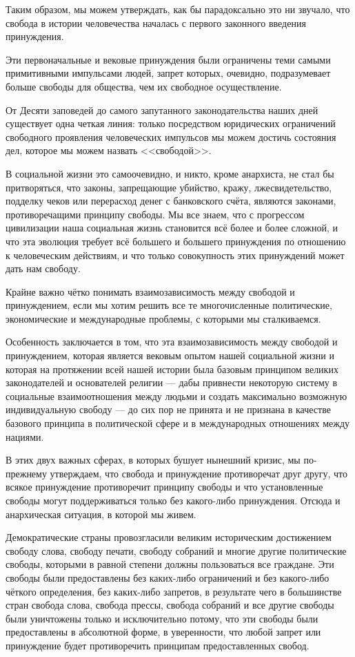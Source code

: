Таким образом, мы можем утверждать, как бы парадоксально это ни звучало, что свобода в истории человечества началась с первого законного введения принуждения.
 
Эти первоначальные и вековые принуждения были ограничены теми самыми примитивными импульсами людей, запрет которых, очевидно, подразумевает больше свободы для общества, чем их свободное осуществление.

От Десяти заповедей до самого запутанного законодательства наших дней существует одна четкая линия: только посредством юридических ограничений свободного проявления человеческих импульсов мы можем достичь состояния дел, которое мы можем назвать <<свободой>>.
 
В социальной жизни это самоочевидно, и никто, кроме анархиста, не стал бы притворяться, что законы, запрещающие убийство, кражу, лжесвидетельство, подделку чеков или перерасход денег с банковского счёта, являются законами, противоречащими принципу свободы. Мы все знаем, что с прогрессом цивилизации наша социальная жизнь становится всё более и более сложной, и что эта эволюция требует всё большего и большего принуждения по отношению к человеческим действиям, и что только совокупность этих принуждений может дать нам свободу.

Крайне важно чётко понимать взаимозависимость между свободой и принуждением, если мы хотим решить все те многочисленные политические, экономические и международные проблемы, с которыми мы сталкиваемся.

Особенность заключается в том, что эта взаимозависимость между свободой и принуждением, которая является вековым опытом нашей социальной жизни и которая на протяжении всей нашей истории была базовым принципом великих законодателей и основателей религии — дабы привнести некоторую систему в социальные взаимоотношения между людьми и создать максимально возможную индивидуальную свободу — до сих пор не принята и не признана в качестве базового принципа в политической сфере и в международных отношениях между нациями.

В этих двух важных сферах, в которых бушует нынешний кризис, мы по-прежнему утверждаем, что свобода и принуждение противоречат друг другу, что всякое принуждение противоречит принципу свободы и что установленные свободы могут поддерживаться только без какого-либо принуждения. Отсюда и анархическая ситуация, в которой мы живем.

Демократические страны провозгласили великим историческим достижением свободу слова, свободу печати, свободу собраний и многие другие политические свободы, которыми в равной степени должны пользоваться все граждане. Эти свободы были предоставлены без каких-либо ограничений и без какого-либо чёткого определения, без каких-либо запретов, в результате чего в большинстве стран свобода слова, свобода прессы, свобода собраний и все другие свободы были уничтожены только и исключительно потому, что эти свободы были предоставлены в абсолютной форме, в уверенности, что любой запрет или принуждение будет противоречить принципам предоставленных свобод.
 
